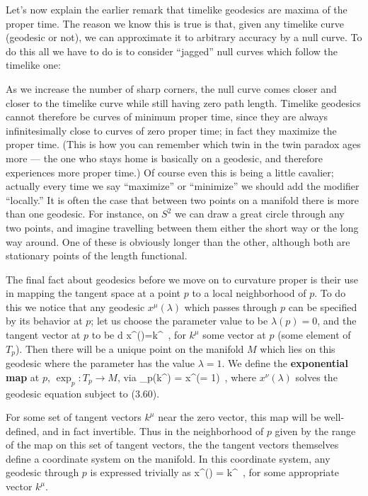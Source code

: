 Let's now explain the earlier remark that timelike geodesics are
maxima of the proper time.  The reason we know this is true is
that, given any timelike curve (geodesic or not), we can approximate
it to arbitrary accuracy by a null curve.  To do this all we have
to do is to consider ``jagged'' null curves which follow the
timelike one:

\eject

\begin{figure}[h]
  \centerline{
  }
\end{figure}

\noindent As we increase the number of sharp corners, the null curve
comes closer and closer to the timelike curve while still having
zero path length.  Timelike geodesics cannot therefore be curves
of minimum proper time, since they are always infinitesimally close
to curves of zero proper time; in fact they maximize the proper time.
(This is how you can remember which twin in the twin paradox ages
more --- the one who stays home is basically on a geodesic, and
therefore experiences more proper time.)  Of course even this is
being a little cavalier; actually every time we say ``maximize''
or ``minimize'' we should add the modifier ``locally.''  It is often
the case that between two points on a manifold there is more than
one geodesic.  For instance, on $S^2$ we can draw a great circle 
through any two points, and imagine travelling between them either 
the short way or the long way around.
One of these is obviously longer than the other, although
both are stationary points of the length functional.

The final fact about geodesics before we move on to curvature proper
is their use in mapping the tangent space at a point $p$ to a local
neighborhood of $p$.  To do this we notice that any geodesic 
$x^\mu(\lambda)$ which passes through $p$ can be specified by its
behavior at $p$; let us choose the parameter value to be 
$\lambda(p)=0$, and the tangent vector at $p$ to be 
\be
  {{d x^\mu}}()=k^\mu\ ,\label{3.60}
\ee
for $k^\mu$ some vector at $p$ (some element of $T_p$).  Then
there will be a unique point on the manifold $M$ which lies on
this geodesic where the
parameter has the value $\lambda=1$.  We define the {\bf exponential
map} at $p$, $\exp_p :T_p\rightarrow M$, via
\be
  \exp_p(k^\mu) = x^\nu(\lambda = 1)\ ,\label{3.61}
\ee
where $x^\nu(\lambda)$ solves the geodesic equation subject to (3.60).
\begin{figure}
  \centerline{
  }
\end{figure}
For some set of tangent vectors $k^\mu$ near the zero vector, 
this map will be well-defined, and in fact invertible.  Thus in the
neighborhood of $p$ given by the range of the map on this set of
tangent vectors, the the tangent vectors themselves define a coordinate
system on the manifold.  In this coordinate system, any geodesic
through $p$ is expressed trivially as
\be
  x^\mu(\lambda) = \lambda k^\mu\ ,\label{3.62}
\ee
for some appropriate vector $k^\mu$.

